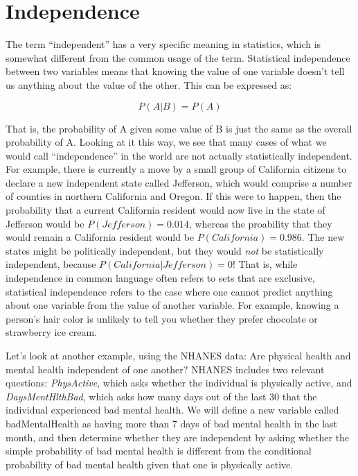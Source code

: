 \documentclass[]{book}
\theoremstyle{definition}
\theoremstyle{definition}
\theoremstyle{definition}
\theoremstyle{remark}
\begin{document}
\section{Independence}\label{independence}

The term ``independent'' has a very specific meaning in statistics,
which is somewhat different from the common usage of the term.
Statistical independence between two variables means that knowing the
value of one variable doesn't tell us anything about the value of the
other. This can be expressed as:

\[
P(A|B) = P(A)
\]

That is, the probability of A given some value of B is just the same as
the overall probability of A. Looking at it this way, we see that many
cases of what we would call ``independence'' in the world are not
actually statistically independent. For example, there is currently a
move by a small group of California citizens to declare a new
independent state called Jefferson, which would comprise a number of
counties in northern California and Oregon. If this were to happen, then
the probability that a current California resident would now live in the
state of Jefferson would be \(P(Jefferson)=0.014\), whereas the
proability that they would remain a California resident would be
\(P(California)=0.986\). The new states might be politically
independent, but they would \emph{not} be statistically independent,
because \(P(California|Jefferson) = 0\)! That is, while independence in
common language often refers to sets that are exclusive, statistical
independence refers to the case where one cannot predict anything about
one variable from the value of another variable. For example, knowing a
person's hair color is unlikely to tell you whether they prefer
chocolate or strawberry ice cream.

Let's look at another example, using the NHANES data: Are physical
health and mental health independent of one another? NHANES includes two
relevant questions: \emph{PhysActive}, which asks whether the individual
is physically active, and \emph{DaysMentHlthBad}, which asks how many
days out of the last 30 that the individual experienced bad mental
health. We will define a new variable called badMentalHealth as having
more than 7 days of bad mental health in the last month, and then
determine whether they are independent by asking whether the simple
probability of bad mental health is different from the conditional
probability of bad mental health given that one is physically active.
\end{document}

